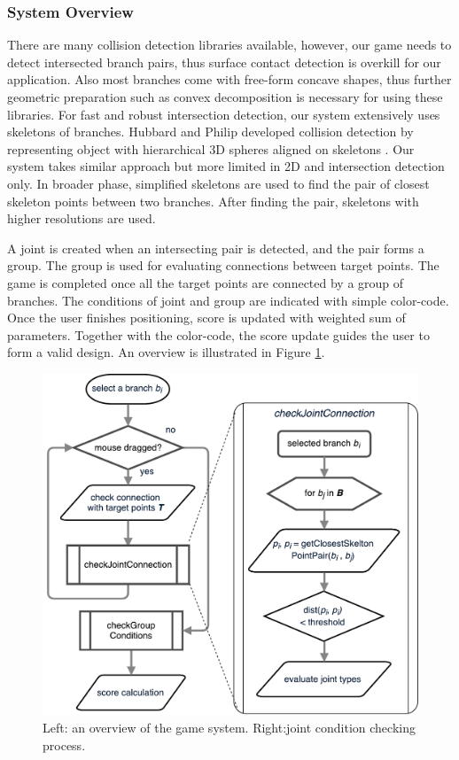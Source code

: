 \subsubsection*{System Overview}
There are many collision detection libraries available, however, our game needs to detect intersected branch pairs, thus surface contact detection is overkill for our application.
Also most branches come with free-form concave shapes, thus further geometric preparation such as convex decomposition is necessary for using these libraries.
For fast and robust intersection detection, our system extensively uses skeletons of branches.
Hubbard and Philip developed collision detection by representing object with hierarchical 3D spheres aligned on skeletons \cite{Hubbard:1996:APS:231731.231732}.
Our system takes similar approach but more limited in 2D and intersection detection only.
In broader phase, simplified skeletons are used to find the pair of closest skeleton points between two branches.
After finding the pair, skeletons with higher resolutions are used.

A joint is created when an intersecting pair is detected, and the pair forms a group.
The group is used for evaluating connections between target points.
The game is completed once all the target points are connected by a group of branches.
The conditions of joint and group are indicated with simple color-code.
Once the user finishes positioning, score is updated with weighted sum of parameters.
Together with the color-code, the score update guides the user to form a valid design.
An overview is illustrated in Figure \ref{fig:system_flowchart}.

\begin{figure}[ht]
  \begin{center}
    \includegraphics[width = 0.25\paperwidth]{images/system/closestPointAlgorithm.pdf}
    \caption{Left: an overview of the game system. Right:joint condition checking process.}
    \label{fig:system_flowchart}
  \end{center}
\end{figure}

